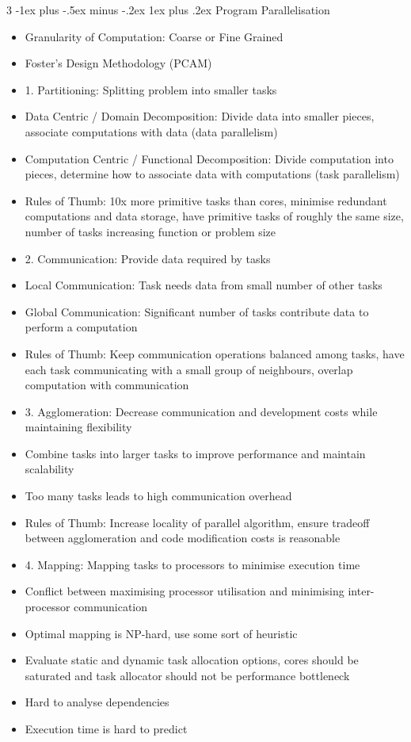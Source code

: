 \documentclass[10pt, landscape]{article}
\makeatletter
\renewcommand{\subsection}{\@startsection{subsection}{3}{0mm}%
                                {-1ex plus -.5ex minus -.2ex}%
                                {1ex plus .2ex}%
                                {\normalfont\small\bfseries}}%
\makeatother
\begin{document}
\begin{multicols*}{3}
\subsection{Program Parallelisation}
\begin{itemize}
    \item Granularity of Computation: Coarse or Fine Grained
    \item Foster's Design Methodology (PCAM)
    \item 1. Partitioning: Splitting problem into smaller tasks
    \item Data Centric / Domain Decomposition: Divide data into smaller pieces, associate computations with data (data parallelism)
    \item Computation Centric / Functional Decomposition: Divide computation into pieces, determine how to associate data with computations (task parallelism)
    \item Rules of Thumb: 10x more primitive tasks than cores, minimise redundant computations and data storage, have primitive tasks of roughly the same size, number of tasks increasing function or problem size
    \item 2. Communication: Provide data required by tasks
    \item Local Communication: Task needs data from small number of other tasks
    \item Global Communication: Significant number of tasks contribute data to perform a computation
    \item Rules of Thumb: Keep communication operations balanced among tasks, have each task communicating with a small group of neighbours, overlap computation with communication
    \item 3. Agglomeration: Decrease communication and development costs while maintaining flexibility
    \item Combine tasks into larger tasks to improve performance and maintain scalability
    \item Too many tasks leads to high communication overhead
    \item Rules of Thumb: Increase locality of parallel algorithm, ensure tradeoff between agglomeration and code modification costs is reasonable
    \item 4. Mapping: Mapping tasks to processors to minimise execution time
    \item Conflict between maximising processor utilisation and minimising inter-processor communication
    \item Optimal mapping is NP-hard, use some sort of heuristic
    \item Evaluate static and dynamic task allocation options, cores should be saturated and task allocator should not be performance bottleneck
    \item Hard to analyse dependencies
    \item Execution time is hard to predict
\end{itemize}


\end{multicols*}
\end{document}
